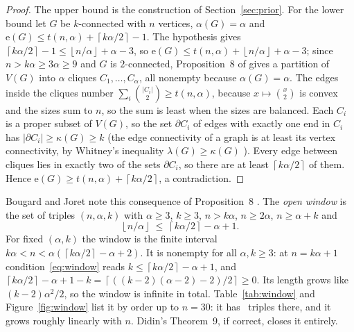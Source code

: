 \documentclass[11pt]{article}
\theoremstyle{definition}
\theoremstyle{remark}
\newcommand{\e}{\mathrm{e}}
\newcommand{\ceil}[1]{\left\lceil #1\right\rceil}
\newcommand{\floor}[1]{\left\lfloor #1\right\rfloor}
\begin{document}
\begin{proof}
The upper bound is the construction of Section~\ref{sec:prior}. For the lower bound let $G$ be $k$-connected with
$n$ vertices, $\alpha(G)=\alpha$ and $\e(G)\le t(n,\alpha)+\ceil{k\alpha/2}-1$. The hypothesis gives
$\ceil{k\alpha/2}-1\le\floor{n/\alpha}+\alpha-3$, so $\e(G)\le t(n,\alpha)+\floor{n/\alpha}+\alpha-3$; since
$n>k\alpha\ge3\alpha\ge9$ and $G$ is $2$-connected, Proposition~8 of \cite{BJ} gives a partition of $V(G)$ into
$\alpha$ cliques $C_1,\dots,C_\alpha$, all nonempty because $\alpha(G)=\alpha$. The edges inside the cliques number
$\sum_i\binom{|C_i|}{2}\ge t(n,\alpha)$, because $x\mapsto\binom{x}{2}$ is convex and the sizes sum to $n$, so the sum
is least when the sizes are balanced. Each $C_i$ is a proper subset of $V(G)$, so the set $\partial C_i$ of edges
with exactly one end in $C_i$ has $|\partial C_i|\ge\kappa(G)\ge k$ (the edge connectivity of a graph is at least its vertex connectivity, by Whitney's
inequality $\lambda(G)\ge\kappa(G)$ \cite{Whitney}). Every
edge between cliques lies in exactly two of the sets $\partial C_i$, so there are at least $\ceil{k\alpha/2}$ of them.
Hence $\e(G)\ge t(n,\alpha)+\ceil{k\alpha/2}$, a contradiction.
\end{proof}

Bougard and Joret note this consequence of Proposition~8 \cite[p.~12]{BJ}. The \emph{open window} is the set of
triples $(n,\alpha,k)$ with $\alpha\ge3$, $k\ge3$, $n>k\alpha$, $n\ge2\alpha$, $n\ge\alpha+k$ and
\begin{equation}\label{eq:window}
\floor{n/\alpha}\ \le\ \ceil{k\alpha/2}-\alpha+1 .
\end{equation}
For fixed $(\alpha,k)$ the window is the finite interval $k\alpha<n<\alpha(\ceil{k\alpha/2}-\alpha+2)$. It is
nonempty for all $\alpha,k\ge3$: at $n=k\alpha+1$ condition~\eqref{eq:window} reads
$k\le\ceil{k\alpha/2}-\alpha+1$, and $\ceil{k\alpha/2}-\alpha+1-k=\ceil{((k-2)(\alpha-2)-2)/2}\ge0$. Its length grows like $(k-2)\alpha^2/2$, so the window is infinite in total. Table~\ref{tab:window} and Figure~\ref{fig:window} list it by order up to $n=30$: it has \nwindowthirty\ triples there, and
it grows roughly linearly with $n$. Didin's Theorem~9, if correct, closes it entirely.
\end{document}
